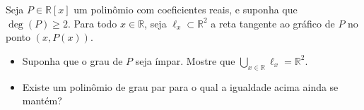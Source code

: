 Seja \(P \in \mathbb{R}[x]\) um polinômio com coeficientes reais, e suponha que \(\deg(P) \ge 2\). Para todo \(x \in \mathbb{R}\), seja \(\ell_x \subset \mathbb{R}^2\) a reta tangente ao gráfico de \(P\) no ponto \((x, P(x))\).
\begin{itemize}
    \item[(a)] Suponha que o grau de \(P\) seja ímpar. Mostre que \(\displaystyle\bigcup_{x \in \mathbb{R}} \ell_x = \mathbb{R}^2\).
    \item[(b)] Existe um polinômio de grau par para o qual a igualdade acima ainda se mantém?
\end{itemize}
